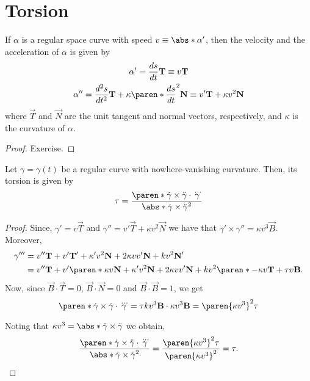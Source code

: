 \documentclass[11pt]{penrose}
\newcommand{\vT}{\vec{T}}
\newcommand{\vN}{\vec{N}}
\newcommand{\vB}{\vec{B}}
\begin{document}
\section{Torsion}

\begin{nlemma}
    If $\alpha$ is a regular space curve with speed $v \equiv \abs*{\alpha'}$, then the velocity and the acceleration of $\alpha$ is given by
    \begin{gather}
        \alpha' = \frac{ds}{dt} \vT \equiv v \vT\\
        \alpha'' = \frac{d^2 s}{dt^2} \vT + \kappa \paren*{\frac{ds}{dt}}^2 \vN \equiv v' \vT + \kappa v^2 \vN
    \end{gather}
    where $\vT$ and $\vN$ are the unit tangent and normal vectors, respectively, and $\kappa$ is the curvature of $\alpha$.
\end{nlemma}
\begin{proof}
    Exercise.
\end{proof}

\begin{nthm}
    Let $\gamma = \gamma(t)$ be a regular curve with nowhere-vanishing curvature. Then, its torsion is given by
    \begin{equation}
        \tau
        = \frac{\paren*{\dot{\gamma} \times \ddot{\gamma}} \cdot \dddot{\gamma}}{\abs*{\dot{\gamma} \times \ddot{\gamma}}^2}
        \label{eq:torsion-formula}
    \end{equation}
\end{nthm}
\begin{proof}
    Since, $\gamma' = v \vT$ and $\gamma'' = v' \vT + \kappa v^2 \vN$ we have that $\gamma' \times \gamma'' = \kappa v^3 \vB$. Moreover,
    \begin{align}
        \gamma'''
        &= v'' \vT + v' \vT' + \kappa' v^2 \vN + 2 \kappa v v' \vN + k v^2 \vN'\\
        &= v'' \vT + v' \paren*{\kappa v \vN} + \kappa' v^2 \vN + 2 \kappa v v' \vN + k v^2 \paren*{-\kappa v \vT + \tau v \vB}.
    \end{align}
    Now, since $\vB \cdot \vT = 0$, $\vB \cdot \vN = 0$ and $\vB \cdot \vB = 1$, we get
    \begin{equation}
        \paren*{\dot{\gamma} \times \ddot{\gamma}} \cdot \dddot{\gamma}
        = \tau k v^3 \vB \cdot \kappa v^3 \vB
        = \paren{\kappa v^3}^2 \tau
    \end{equation}

    Noting that $\kappa v^3 = \abs*{\dot{\gamma} \times \ddot{\gamma}}$ we obtain,
    \begin{equation}
        \frac{\paren*{\dot{\gamma} \times \ddot{\gamma}} \cdot \dddot{\gamma}}{\abs*{\dot{\gamma} \times \ddot{\gamma}}^2}
        = \frac{\paren{\kappa v^3}^2 \tau}{\paren{\kappa v^3}^2}
        = \tau.\qedhere
    \end{equation}
\end{proof}
\end{document}
